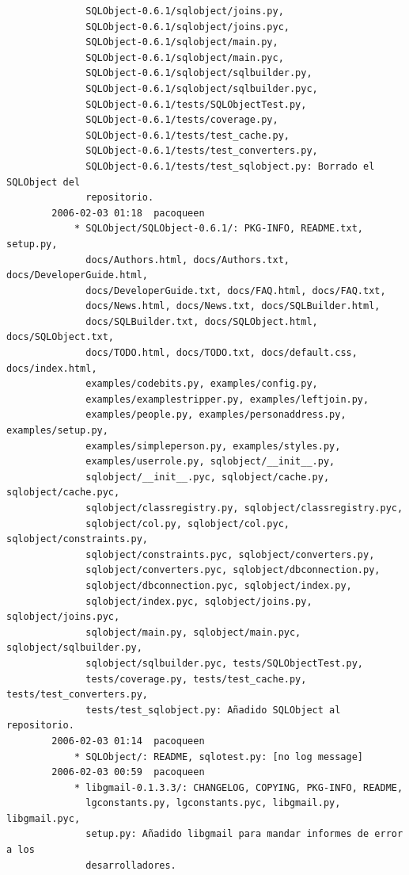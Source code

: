\documentclass[a4paper]{article}
\begin{document}
\begin{verbatim}
              SQLObject-0.6.1/sqlobject/joins.py,
              SQLObject-0.6.1/sqlobject/joins.pyc,
              SQLObject-0.6.1/sqlobject/main.py,
              SQLObject-0.6.1/sqlobject/main.pyc,
              SQLObject-0.6.1/sqlobject/sqlbuilder.py,
              SQLObject-0.6.1/sqlobject/sqlbuilder.pyc,
              SQLObject-0.6.1/tests/SQLObjectTest.py,
              SQLObject-0.6.1/tests/coverage.py,
              SQLObject-0.6.1/tests/test_cache.py,
              SQLObject-0.6.1/tests/test_converters.py,
              SQLObject-0.6.1/tests/test_sqlobject.py: Borrado el SQLObject del
              repositorio.
        2006-02-03 01:18  pacoqueen
            * SQLObject/SQLObject-0.6.1/: PKG-INFO, README.txt, setup.py,
              docs/Authors.html, docs/Authors.txt, docs/DeveloperGuide.html,
              docs/DeveloperGuide.txt, docs/FAQ.html, docs/FAQ.txt,
              docs/News.html, docs/News.txt, docs/SQLBuilder.html,
              docs/SQLBuilder.txt, docs/SQLObject.html, docs/SQLObject.txt,
              docs/TODO.html, docs/TODO.txt, docs/default.css, docs/index.html,
              examples/codebits.py, examples/config.py,
              examples/examplestripper.py, examples/leftjoin.py,
              examples/people.py, examples/personaddress.py, examples/setup.py,
              examples/simpleperson.py, examples/styles.py,
              examples/userrole.py, sqlobject/__init__.py,
              sqlobject/__init__.pyc, sqlobject/cache.py, sqlobject/cache.pyc,
              sqlobject/classregistry.py, sqlobject/classregistry.pyc,
              sqlobject/col.py, sqlobject/col.pyc, sqlobject/constraints.py,
              sqlobject/constraints.pyc, sqlobject/converters.py,
              sqlobject/converters.pyc, sqlobject/dbconnection.py,
              sqlobject/dbconnection.pyc, sqlobject/index.py,
              sqlobject/index.pyc, sqlobject/joins.py, sqlobject/joins.pyc,
              sqlobject/main.py, sqlobject/main.pyc, sqlobject/sqlbuilder.py,
              sqlobject/sqlbuilder.pyc, tests/SQLObjectTest.py,
              tests/coverage.py, tests/test_cache.py, tests/test_converters.py,
              tests/test_sqlobject.py: Añadido SQLObject al repositorio.
        2006-02-03 01:14  pacoqueen
            * SQLObject/: README, sqlotest.py: [no log message]
        2006-02-03 00:59  pacoqueen
            * libgmail-0.1.3.3/: CHANGELOG, COPYING, PKG-INFO, README,
              lgconstants.py, lgconstants.pyc, libgmail.py, libgmail.pyc,
              setup.py: Añadido libgmail para mandar informes de error a los
              desarrolladores.

\end{verbatim}
\end{document}
